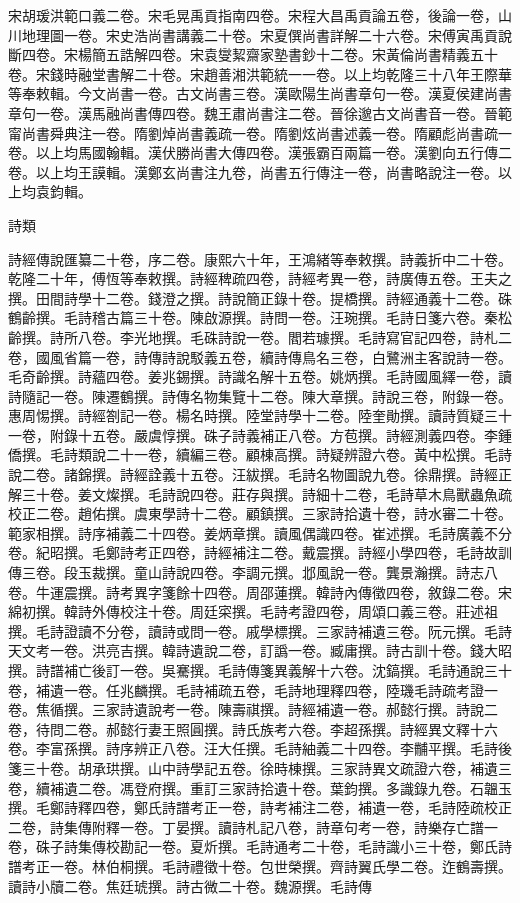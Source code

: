 \begin{pinyinscope}
宋胡瑗洪範口義二卷。宋毛晃禹貢指南四卷。宋程大昌禹貢論五卷，後論一卷，山川地理圖一卷。宋史浩尚書講義二十卷。宋夏僎尚書詳解二十六卷。宋傅寅禹貢說斷四卷。宋楊簡五誥解四卷。宋袁燮絜齋家塾書鈔十二卷。宋黃倫尚書精義五十卷。宋錢時融堂書解二十卷。宋趙善湘洪範統一一卷。以上均乾隆三十八年王際華等奉敕輯。今文尚書一卷。古文尚書三卷。漢歐陽生尚書章句一卷。漢夏侯建尚書章句一卷。漢馬融尚書傳四卷。魏王肅尚書注二卷。晉徐邈古文尚書音一卷。晉範甯尚書舜典注一卷。隋劉焯尚書義疏一卷。隋劉炫尚書述義一卷。隋顧彪尚書疏一卷。以上均馬國翰輯。漢伏勝尚書大傳四卷。漢張霸百兩篇一卷。漢劉向五行傳二卷。以上均王謨輯。漢鄭玄尚書注九卷，尚書五行傳注一卷，尚書略說注一卷。以上均袁鈞輯。

詩類

詩經傳說匯纂二十卷，序二卷。康熙六十年，王鴻緒等奉敕撰。詩義折中二十卷。乾隆二十年，傅恆等奉敕撰。詩經稗疏四卷，詩經考異一卷，詩廣傳五卷。王夫之撰。田間詩學十二卷。錢澄之撰。詩說簡正錄十卷。提橋撰。詩經通義十二卷。硃鶴齡撰。毛詩稽古篇三十卷。陳啟源撰。詩問一卷。汪琬撰。毛詩日箋六卷。秦松齡撰。詩所八卷。李光地撰。毛硃詩說一卷。閻若璩撰。毛詩寫官記四卷，詩札二卷，國風省篇一卷，詩傳詩說駁義五卷，續詩傳鳥名三卷，白鷺洲主客說詩一卷。毛奇齡撰。詩蘊四卷。姜兆錫撰。詩識名解十五卷。姚炳撰。毛詩國風繹一卷，讀詩隨記一卷。陳遷鶴撰。詩傳名物集覽十二卷。陳大章撰。詩說三卷，附錄一卷。惠周惕撰。詩經劄記一卷。楊名時撰。陸堂詩學十二卷。陸奎勛撰。讀詩質疑三十一卷，附錄十五卷。嚴虞惇撰。硃子詩義補正八卷。方苞撰。詩經測義四卷。李鍾僑撰。毛詩類說二十一卷，續編三卷。顧棟高撰。詩疑辨證六卷。黃中松撰。毛詩說二卷。諸錦撰。詩經詮義十五卷。汪紱撰。毛詩名物圖說九卷。徐鼎撰。詩經正解三十卷。姜文燦撰。毛詩說四卷。莊存與撰。詩細十二卷，毛詩草木鳥獸蟲魚疏校正二卷。趙佑撰。虞東學詩十二卷。顧鎮撰。三家詩拾遺十卷，詩水審二十卷。範家相撰。詩序補義二十四卷。姜炳章撰。讀風偶識四卷。崔述撰。毛詩廣義不分卷。紀昭撰。毛鄭詩考正四卷，詩經補注二卷。戴震撰。詩經小學四卷，毛詩故訓傳三卷。段玉裁撰。童山詩說四卷。李調元撰。邶風說一卷。龔景瀚撰。詩志八卷。牛運震撰。詩考異字箋餘十四卷。周邵蓮撰。韓詩內傳徵四卷，敘錄二卷。宋綿初撰。韓詩外傳校注十卷。周廷寀撰。毛詩考證四卷，周頌口義三卷。莊述祖撰。毛詩證讀不分卷，讀詩或問一卷。戚學標撰。三家詩補遺三卷。阮元撰。毛詩天文考一卷。洪亮吉撰。韓詩遺說二卷，訂譌一卷。臧庸撰。詩古訓十卷。錢大昭撰。詩譜補亡後訂一卷。吳騫撰。毛詩傳箋異義解十六卷。沈鎬撰。毛詩通說三十卷，補遺一卷。任兆麟撰。毛詩補疏五卷，毛詩地理釋四卷，陸璣毛詩疏考證一卷。焦循撰。三家詩遺說考一卷。陳壽祺撰。詩經補遺一卷。郝懿行撰。詩說二卷，待問二卷。郝懿行妻王照圓撰。詩氏族考六卷。李超孫撰。詩經異文釋十六卷。李富孫撰。詩序辨正八卷。汪大任撰。毛詩紬義二十四卷。李黼平撰。毛詩後箋三十卷。胡承珙撰。山中詩學記五卷。徐時棟撰。三家詩異文疏證六卷，補遺三卷，續補遺二卷。馮登府撰。重訂三家詩拾遺十卷。葉鈞撰。多識錄九卷。石韞玉撰。毛鄭詩釋四卷，鄭氏詩譜考正一卷，詩考補注二卷，補遺一卷，毛詩陸疏校正二卷，詩集傳附釋一卷。丁晏撰。讀詩札記八卷，詩章句考一卷，詩樂存亡譜一卷，硃子詩集傳校勘記一卷。夏炘撰。毛詩通考二十卷，毛詩識小三十卷，鄭氏詩譜考正一卷。林伯桐撰。毛詩禮徵十卷。包世榮撰。齊詩翼氏學二卷。迮鶴壽撰。讀詩小牘二卷。焦廷琥撰。詩古微二十卷。魏源撰。毛詩傳
\end{pinyinscope}
